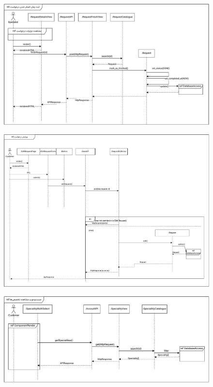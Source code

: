 \begin{figure}[ht!]
	\centering
	\includegraphics[scale=0.8]{figs/design-sequence/3-20.pdf}
\end{figure}
\FloatBarrier
\newpage

\begin{figure}[ht!]
	\centering
	\includegraphics[scale=0.8]{figs/design-sequence/3-21.pdf}
\end{figure}
\FloatBarrier
\newpage

\begin{figure}[ht!]
	\centering
	\includegraphics[scale=0.8]{figs/design-sequence/3-22.pdf}
\end{figure}
\FloatBarrier
\newpage

